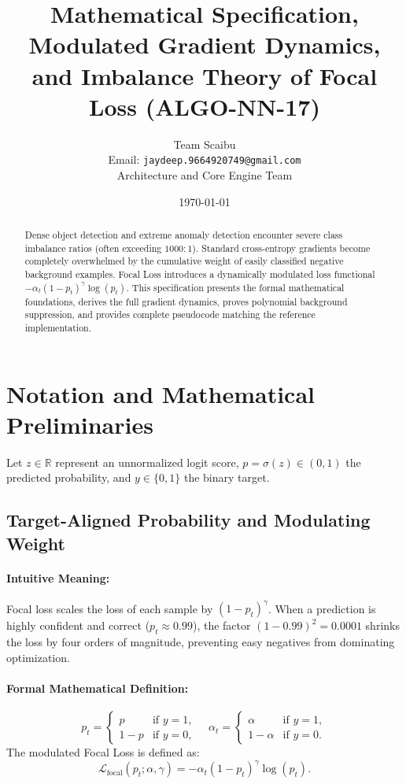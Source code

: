\documentclass[11pt]{article}
\title{\textbf{Mathematical Specification, Modulated Gradient Dynamics, and Imbalance Theory of Focal Loss (ALGO-NN-17)}}
\author{Team Scaibu \\ \small Email: \texttt{jaydeep.9664920749@gmail.com} \\ \small Architecture and Core Engine Team}
\date{\today}
\begin{document}
\maketitle

\begin{abstract}
Dense object detection and extreme anomaly detection encounter severe class imbalance ratios (often exceeding $1000:1$). Standard cross-entropy gradients become completely overwhelmed by the cumulative weight of easily classified negative background examples. Focal Loss introduces a dynamically modulated loss functional $-\alpha_t (1 - p_t)^\gamma \log(p_t)$. This specification presents the formal mathematical foundations, derives the full gradient dynamics, proves polynomial background suppression, and provides complete pseudocode matching the reference implementation.
\end{abstract}

\section{Notation and Mathematical Preliminaries}
\label{sec:notation}

Let $z \in \mathbb{R}$ represent an unnormalized logit score, $p = \sigma(z) \in (0, 1)$ the predicted probability, and $y \in \{0, 1\}$ the binary target.

\subsection{Target-Aligned Probability and Modulating Weight}
\paragraph{Intuitive Meaning:} Focal loss scales the loss of each sample by $(1 - p_t)^\gamma$. When a prediction is highly confident and correct ($p_t \approx 0.99$), the factor $(1 - 0.99)^2 = 0.0001$ shrinks the loss by four orders of magnitude, preventing easy negatives from dominating optimization.

\paragraph{Formal Mathematical Definition:}
\begin{equation}
\label{eq:pt_def}
p_t = \begin{cases} p & \text{if } y = 1, \\ 1 - p & \text{if } y = 0, \end{cases} \quad \alpha_t = \begin{cases} \alpha & \text{if } y = 1, \\ 1 - \alpha & \text{if } y = 0. \end{cases}
\end{equation}
The modulated Focal Loss is defined as:
\begin{equation}
\label{eq:focal_def}
\mathcal{L}_{\mathrm{focal}}(p_t; \alpha, \gamma) = -\alpha_t (1 - p_t)^\gamma \log(p_t).
\end{equation}
\end{document}
